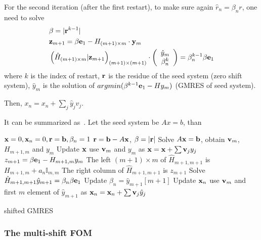 For the second iteration (after the first restart), to make sure again $\hat{r}_n = \beta _n r$, one need to solve
\begin{equation}
\begin{split}
&\beta = |{\bf r}^{k-1}|\\
&{\bf z}_{m+1}=\beta {\bf e}_1 - H_{ (m+1)\times m}\cdot {\bf y}_m\\
&\left(\hat{H}_{(m+1)\times m} | {\bf z}_{m+1}\right)_{(m+1)\times (m+1)} \cdot \left(\begin{array}{c}\hat{y}_m \\ \beta _n^k\end{array}\right) = \beta _n^{k-1} \beta {\bf e}_1
\end{split}
\end{equation}
where $k$ is the index of restart, ${\bf r}$ is the residue of the seed system (zero shift system), $\hat{y}_m$ is the solution of $argmin (\beta ^{k-1} {\bf e}_1 - H y_m )$ (GMRES of seed system).

Then, $x_n=x_n+\sum _j \hat{y}_j v_j$.

It can be summarized as~\cite{shiftedGMRES}. Let the seed system be $Ax=b$, than
\begin{algorithm}[H]
\begin{algorithmic}
\State ${\bf x}=0,{\bf x}_n=0,{\bf r}={\bf b},\beta _n=1$
    \State ${\bf r}={\bf b}-A{\bf x}$, $\beta = |{\bf r}|$
    \State Solve $A{\bf x}={\bf b}$, obtain ${\bf v}_m$, $H_{m+1,m}$ and $y_m$
    \State Update ${\bf x}$ use ${\bf v}_m$ and $y_m$ as ${\bf x}={\bf x}+\sum {\bf v}_j y_j$
    \State $z_{m+1}=\beta {\bf e}_1 - H_{m+1,m} y_m$
        \State The left $(m+1)\times m$ of $\hat{H}_{m+1,m+1}$ is $H_{m+1,m}+ a_n \mathbb{I}_{m,m}$
        \State The right column of $\hat{H}_{m+1,m+1}$ is $z_{m+1}$
        \State Solve $\hat{H}_{m+1,m+1} \hat{y}_{m+1} = \beta _n \beta {\bf e}_1$
        \State Update $\beta _n = \hat{y}_{m+1}[m+1]$
        \State Update ${\bf x}_n$ use ${\bf v}_m$ and first $m$ element of $\hat{y}_{m+1}$ as ${\bf x}_n={\bf x}_n+\sum {\bf v}_j \hat{y}_j$
    \EndFor
\EndFor
\end{algorithmic}
\caption{\label{alg.GEMRES.shifted}shifted GMRES}
\end{algorithm}

\subsubsection{\label{sec:MultishiftFOM}The multi-shift FOM}

